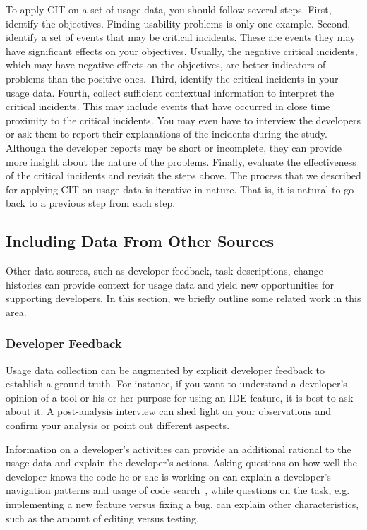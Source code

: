 To apply CIT on a set of usage data, you should follow several steps. First,
identify the objectives. Finding usability problems is only one example.
Second, identify a set of events that may be critical incidents. These are
events they may have significant effects on your objectives. Usually, the
negative critical incidents, which may have negative effects on the objectives,
are better indicators of problems than the positive ones. Third, identify the
critical incidents in your usage data. Fourth, collect sufficient contextual
information to interpret the critical incidents. This may include events that
have occurred in close time proximity to the critical incidents. You may even
have to interview the developers or ask them to report their explanations of the
incidents during the study. Although the developer reports may be short or
incomplete, they can provide more insight about the nature of the problems.
Finally, evaluate the effectiveness of the critical incidents and revisit the
steps above. The process that we described for applying CIT on usage data is
iterative in nature. That is, it is natural to go back to a previous step from
each step.

\label{sec:IncludingOtherSources}
\subsection{Including Data From Other Sources}


Other data sources, such as developer feedback, task descriptions, change histories can provide context for usage data and yield new opportunities for supporting developers. In this section, we briefly outline some related work in this area.

\subsubsection{Developer Feedback}

Usage data collection can be augmented by explicit developer feedback to establish a ground truth. For instance, if you want to understand a developer's opinion of a tool or his or her purpose for using an IDE feature, it is best to ask about it. A post-analysis interview can shed light on your observations and confirm your analysis or point out different aspects.

Information on a developer's activities can provide an additional rational to the usage data and explain the developer's actions. Asking questions on how well the developer knows the code he or she is working on can explain a developer's navigation patterns and usage of code search~\cite{SnipesExperiencesGamifyingSoftwareDevelopment}, while questions on the task, e.g. implementing a new feature versus fixing a bug, can explain other characteristics, such as the amount of editing versus testing.

